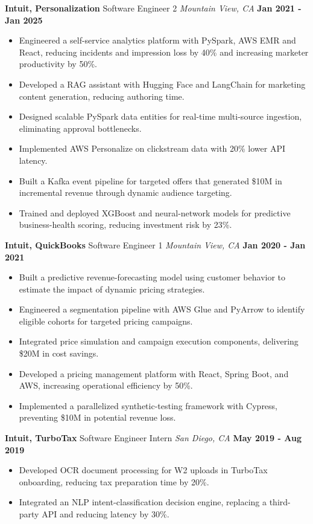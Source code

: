 \documentclass[10pt, letterpaper]{article}
\newcommand{\jobentry}[4]{
  \noindent\textbf{#1} \hfill #2 \hfill \textit{#3} \hfill \textbf{#4}
}
\begin{document}
\jobentry{Intuit, Personalization}{Software Engineer 2}{Mountain View, CA}{Jan 2021 - Jan 2025}
\begin{itemize}
\item Engineered a self-service analytics platform with PySpark, AWS EMR and React, reducing incidents and impression loss by 40\% and increasing marketer productivity by 50\%.
\item Developed a RAG assistant with Hugging Face and LangChain for marketing content generation, reducing authoring time.
\item Designed scalable PySpark data entities for real-time multi-source ingestion, eliminating approval bottlenecks.
\item Implemented AWS Personalize on clickstream data with 20\% lower API latency.
\item Built a Kafka event pipeline for targeted offers that generated \$10M in incremental revenue through dynamic audience targeting.
\item Trained and deployed XGBoost and neural-network models for predictive business-health scoring, reducing investment risk by 23\%.
\end{itemize}
\jobentry{Intuit, QuickBooks}{Software Engineer 1}{Mountain View, CA}{Jan 2020 - Jan 2021}
\begin{itemize}
\item Built a predictive revenue-forecasting model using customer behavior to estimate the impact of dynamic pricing strategies.
\item Engineered a segmentation pipeline with AWS Glue and PyArrow to identify eligible cohorts for targeted pricing campaigns.
\item Integrated price simulation and campaign execution components, delivering \$20M in cost savings.
\item Developed a pricing management platform with React, Spring Boot, and AWS, increasing operational efficiency by 50\%.
\item Implemented a parallelized synthetic-testing framework with Cypress, preventing \$10M in potential revenue loss.
\end{itemize}
\jobentry{Intuit, TurboTax}{Software Engineer Intern}{San Diego, CA}{May 2019 - Aug 2019}
\begin{itemize}
\item Developed OCR document processing for W2 uploads in TurboTax onboarding, reducing tax preparation time by 20\%.
\item Integrated an NLP intent-classification decision engine, replacing a third-party API and reducing latency by 30\%.
\end{itemize}
\end{document}
